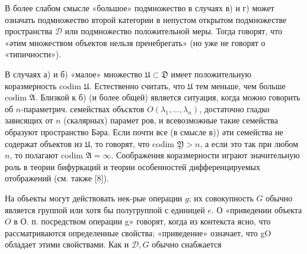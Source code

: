 \documentclass[10pt]{article}
\begin{document}
В более слабом смысле «большое» подмножество в случаях в) и г) может означать подмножество второй категории в непустом открытом подмножестве пространства $\mathcal{D}$ или подмножество положительной меры. Тогда говорят, что «әтим множеством объектов нельзя пренебрегать» (но уже не говорят о «типичности»).



В случаях а) и б) «малое» множество $\mathfrak{U} \subset \mathfrak{D}$ имеет положительную коразмерность codim $\mathfrak{U}$. Естественно считать, что $\mathfrak{U}$ тем меньше, чем больше codim $\mathfrak{A}$. Близкой к б) (и более общей) является ситуация, когда можно говорить об $n$-параметрич. семействах объсктов $O\left(\lambda_{1}, \ldots, \lambda_{n}\right)$, достаточно гладко зависящих от $n$ (скалярных) парамет ров, и всевозможные такие семейства образуют пространство Бәра. Если почти все (в смысле в)) әти семейства не содержат объектов из $\mathfrak{U}$, то говорят, что codim $\mathfrak{Y}>n$, а если это так при любом $n$, то полагают codim $\mathfrak{A}=\infty$. Соображения коразмерности играют значительную роль в теории бифуркаций и теории особенностей дифференцируемых отображений (см. также [8]).



На объекты могут действовать нек-рые операции $g$; их совокупность $G$ обычно является группой или хотя бы полугруппой с единицей $e$. О «приведении объекта $O$ в О. п. посредством операции g» говорят, когда из контекста ясно, что рассматриваются определенные свойства; «приведение» означает, что gO обладает этими свойствами. Как и $\mathcal{D}, G$ обычно снабжается
\end{document}
